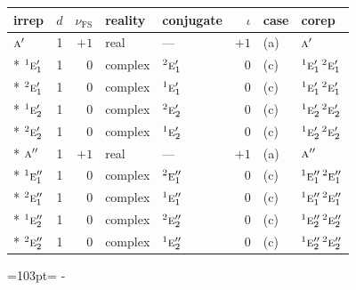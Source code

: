 \documentclass[10pt,a4paper]{article}
\newcommand{\needspace}[1]{\par\penalty-100\begingroup\dimen0=#1\relax\dimen2=\pagegoal
  \advance\dimen2-\pagetotal\ifdim\dimen0>\dimen2\relax\ifdim\dimen2>0pt\vfil\break\fi\fi
  \endgroup}
\numberwithin{equation}{section}
\newcommand{\irr}[1]{\text{\normalfont\scshape #1}}
\newcommand{\conjpair}[1]{{}^{#1}}
\newcommand{\fsind}{\nu_{\mathrm{FS}}}
\begin{document}
{\small\renewcommand{\arraystretch}{1.25}\setlength{\tabcolsep}{4pt}\begin{longtable}{@{}lrrllrll@{}}\toprule
irrep & $d$ & $\fsind$ & reality & conjugate & $\iota$ & case & corep\\\midrule\endhead
\bottomrule\endfoot\endlastfoot
$\irr{a}'$ & 1 & $+1$ & real & --- & $+1$ & (a) & $\irr{a}'$\\*
$\conjpair{1}\irr{e}_{1}'$ & 1 & $0$ & complex & $\conjpair{2}\irr{e}_{1}'$ & $0$ & (c) & $\conjpair{1}\irr{e}_{1}'\,\conjpair{2}\irr{e}_{1}'$\\*
$\conjpair{2}\irr{e}_{1}'$ & 1 & $0$ & complex & $\conjpair{1}\irr{e}_{1}'$ & $0$ & (c) & $\conjpair{1}\irr{e}_{1}'\,\conjpair{2}\irr{e}_{1}'$\\*
$\conjpair{1}\irr{e}_{2}'$ & 1 & $0$ & complex & $\conjpair{2}\irr{e}_{2}'$ & $0$ & (c) & $\conjpair{1}\irr{e}_{2}'\,\conjpair{2}\irr{e}_{2}'$\\*
$\conjpair{2}\irr{e}_{2}'$ & 1 & $0$ & complex & $\conjpair{1}\irr{e}_{2}'$ & $0$ & (c) & $\conjpair{1}\irr{e}_{2}'\,\conjpair{2}\irr{e}_{2}'$\\*
$\irr{a}''$ & 1 & $+1$ & real & --- & $+1$ & (a) & $\irr{a}''$\\*
$\conjpair{1}\irr{e}_{1}''$ & 1 & $0$ & complex & $\conjpair{2}\irr{e}_{1}''$ & $0$ & (c) & $\conjpair{1}\irr{e}_{1}''\,\conjpair{2}\irr{e}_{1}''$\\*
$\conjpair{2}\irr{e}_{1}''$ & 1 & $0$ & complex & $\conjpair{1}\irr{e}_{1}''$ & $0$ & (c) & $\conjpair{1}\irr{e}_{1}''\,\conjpair{2}\irr{e}_{1}''$\\*
$\conjpair{1}\irr{e}_{2}''$ & 1 & $0$ & complex & $\conjpair{2}\irr{e}_{2}''$ & $0$ & (c) & $\conjpair{1}\irr{e}_{2}''\,\conjpair{2}\irr{e}_{2}''$\\*
$\conjpair{2}\irr{e}_{2}''$ & 1 & $0$ & complex & $\conjpair{1}\irr{e}_{2}''$ & $0$ & (c) & $\conjpair{1}\irr{e}_{2}''\,\conjpair{2}\irr{e}_{2}''$\\
\bottomrule\end{longtable}}
\needspace{103pt}
\end{document}

